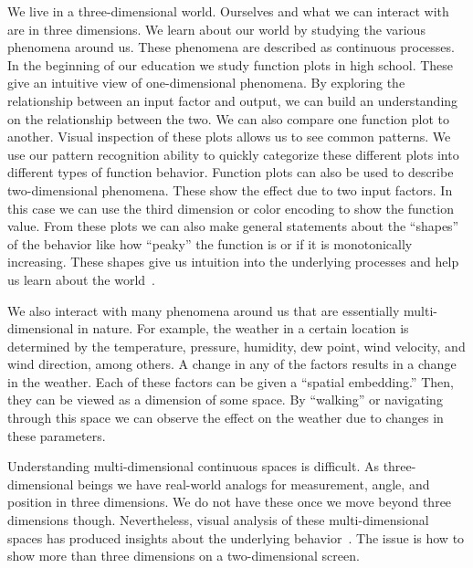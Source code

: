 
We live in a three-dimensional world.  Ourselves and what we can interact with
are in three dimensions.  We learn about our world by studying the various
phenomena around us.  These phenomena are described as continuous processes.
In the beginning of our  education we study function plots in high school.
These give an intuitive view of one-dimensional phenomena.  By exploring the
relationship between an input factor
and output,
we can build an understanding on the relationship between the two.  We can also
compare one function plot to another. Visual inspection of these plots allows
us to see common patterns. We use our pattern recognition ability to quickly
categorize these different plots into different types of function behavior.
Function plots can also be used to describe two-dimensional phenomena. These
show the effect due to two input factors. In this case we can use the third
dimension or color encoding to show the function value.  From these plots we
can also make general statements about the ``shapes'' of the behavior like how
``peaky'' the function is or if it is monotonically increasing. These shapes
give us intuition into the underlying processes and help us learn about the
world~\cite{Palmer:1999}.

We also interact with many phenomena around us that are essentially
multi-dimensional in nature. For example, the weather in a certain location is
determined by the temperature, pressure, humidity, dew point, wind velocity,
and wind direction, among others. A change in any of the factors results in a
change in the weather. Each of these factors can be given a ``spatial
embedding.'' Then, they can be viewed as a dimension of some space.  By
``walking'' or navigating through this space we can observe the effect on the
weather due to changes in these parameters. 

Understanding multi-dimensional continuous spaces is difficult. As
three-dimensional beings we have real-world analogs for measurement, angle, and
position in three dimensions. We do not have these once we move beyond three
dimensions though. Nevertheless, visual analysis of these multi-dimensional
spaces has produced insights about the underlying
behavior~\cite{Sedlmair:2014,Gleicher:2016}. The issue is how to show more than
three dimensions on a two-dimensional screen. 


